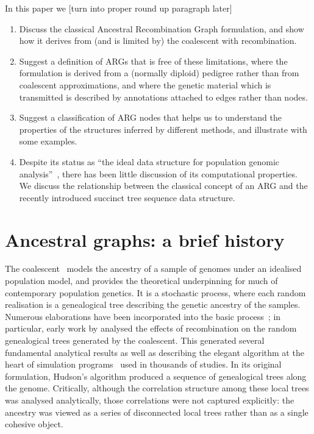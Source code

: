 \documentclass{article}
\begin{document}
In this paper we [turn into proper round up paragraph later]
\begin{enumerate}
\item Discuss the classical Ancestral Recombination Graph formulation,
and show how it derives from (and is limited by) the coalescent with
recombination.
\item Suggest a definition of ARGs that is free of these limitations,
where the formulation is derived from a (normally diploid) pedigree rather than from
coalescent approximations, and where the genetic
material which is transmitted is described by annotations attached to
edges rather than nodes.
\item Suggest a classification of ARG nodes that helps us to understand
the properties of the structures inferred by different methods, and illustrate
with some examples.
\item Despite its status as ``the ideal data structure for
population genomic analysis''~\citep{rasmussen2014genome}, there has been
little discussion of its computational properties. We discuss the
relationship between the classical concept of an ARG and the
recently introduced succinct tree sequence data structure.
\end{enumerate}

\section*{Ancestral graphs: a brief history}
The coalescent~\citep{kingman1982coalescent,kingman1982genealogy,
hudson1983testing, tajima1983evolutionary} models the ancestry of a sample of
genomes under an idealised population model, and provides the theoretical
underpinning for much of contemporary population genetics.
It is a stochastic process, where each random realisation
is a genealogical tree describing the genetic ancestry of the samples.
Numerous elaborations have been incorporated into the
basic process~\citep{hudson1990gene,hein2004gene,wakely2008coalescent};
in particular, early work by \citet{hudson1983properties}
analysed the effects of recombination on the random genealogical
trees generated by the coalescent. This
generated several fundamental analytical results
as well as describing the elegant algorithm
at the heart of simulation
programs~\citep{hudson2002generating,kelleher2016efficient,baumdicker2021efficient}
used in thousands of studies.
In its original formulation, Hudson's algorithm produced a
sequence of genealogical trees along the genome.
Critically, although the correlation structure among these
local trees was analysed analytically, those correlations
were not captured explicitly: the ancestry
was viewed as a series of disconnected local trees rather than
as a single cohesive object.
\end{document}
